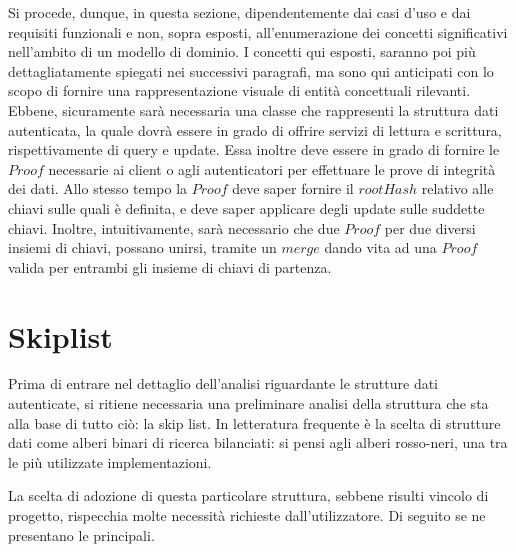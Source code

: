  	Si procede, dunque, in questa sezione, dipendentemente dai casi d'uso e dai requisiti funzionali e non, sopra esposti, all'enumerazione dei concetti significativi nell'ambito di un modello di dominio. I concetti qui esposti, saranno poi più dettagliatamente spiegati nei successivi paragrafi, ma sono qui anticipati con lo scopo di fornire una rappresentazione visuale di entità concettuali rilevanti.
 	Ebbene, sicuramente sarà necessaria una classe che rappresenti la struttura dati autenticata, la quale dovrà essere in grado di offrire servizi di lettura e scrittura, rispettivamente di query e update. Essa inoltre deve essere in grado di fornire le $ Proof $ necessarie ai client o agli autenticatori per effettuare le prove di integrità dei dati. Allo stesso tempo la $ Proof $ deve saper fornire il $ root Hash $ relativo alle chiavi sulle quali è definita, e deve saper applicare degli update sulle suddette chiavi. Inoltre, intuitivamente, sarà necessario che due $ Proof $ per due diversi insiemi di chiavi, possano unirsi, tramite un $ merge $ dando vita ad una $ Proof $ valida per entrambi gli insieme di chiavi di partenza.
 	
	
\section{Skiplist}

%

	Prima di entrare nel dettaglio dell'analisi riguardante le strutture dati autenticate, si ritiene necessaria una preliminare analisi della struttura che sta alla base di tutto ciò: la skip list. In letteratura frequente è la scelta di strutture dati come alberi binari di ricerca bilanciati: si pensi agli alberi rosso-neri, una tra le più utilizzate implementazioni.
	
	La scelta di adozione di questa particolare struttura, sebbene risulti vincolo di progetto, rispecchia molte necessità richieste dall'utilizzatore. Di seguito se ne presentano le principali.
	
